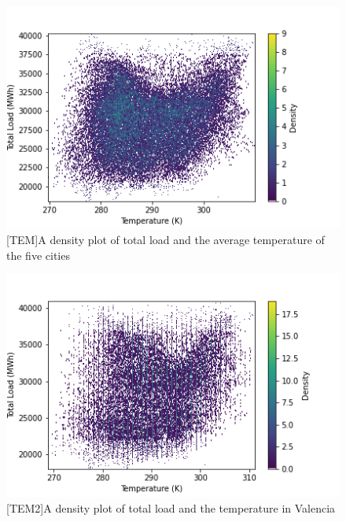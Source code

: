 \documentclass[10pt]{article}
\begin{document}
\begin{figure}[H]
    \centering
    \begin{minipage}[t]{0.45\textwidth}
    \centering
    \includegraphics[width=.9\linewidth]{load_vs_temp.png}
    [TEM]{A density plot of total load and the average temperature of the five cities}
    \label{loadVsTemp1}
    \end{minipage}%
    \hfill
    \begin{minipage}[t]{0.45\textwidth}
    \centering
    \includegraphics[width=.9\linewidth]{load_vs_temp_valencia.png}
    [TEM2]{A density plot of total load and the temperature in Valencia}
    \label{loadVsTemp2}
    \end{minipage}
\end{figure}%
\end{document}
